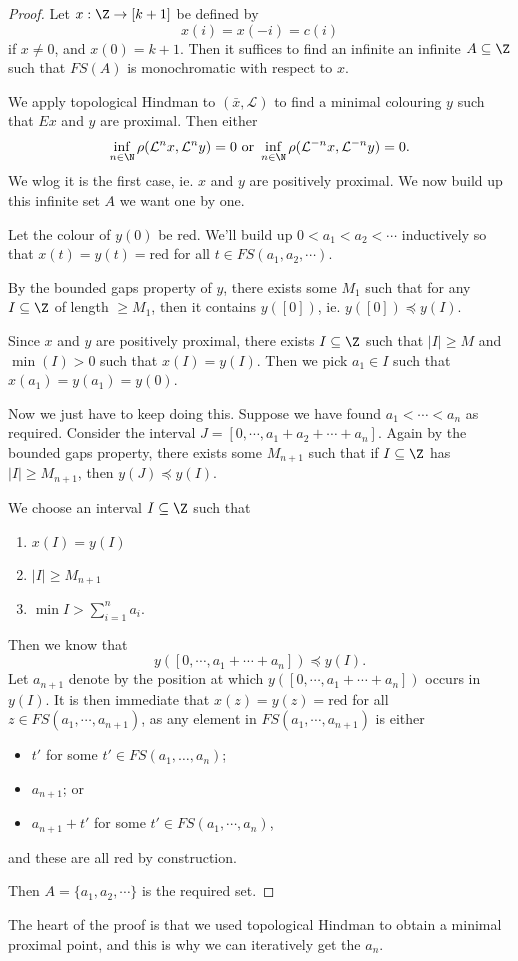 \documentclass[a4paper]{article}
\begin{document}
\begin{proof}
  Let $x: \Z \to [k + 1]$ be defined by
  \[
    x(i) = x(-i) = c(i)
  \]
  if $x\not= 0$, and $x(0) = k + 1$. Then it suffices to find an infinite an infinite $A \subseteq \Z$ such that $FS(A)$ is monochromatic with respect to $x$.

  We apply topological Hindman to $(\bar{x}, \mathcal{L})$ to find a minimal colouring $y$ such that $Ex$ and $y$ are proximal. Then either
  \[
    \inf_{n \in \N} \rho(\mathcal{L}^n x, \mathcal{L}^n y) = 0\text{ or } \inf_{n \in \N} \rho(\mathcal{L}^{-n} x, \mathcal{L}^{-n} y) = 0.
  \]
  We wlog it is the first case, ie. $x$ and $y$ are positively proximal. We now build up this infinite set $A$ we want one by one.

  Let the colour of $y(0)$ be red. We'll build up $0 < a_1 < a_2 < \cdots$ inductively so that $x(t) = y(t) = \text{red}$ for all $t \in FS(a_1, a_2, \cdots)$.

  By the bounded gaps property of $y$, there exists some $M_1$ such that for any $I \subseteq \Z$ of length $\geq M_1$, then it contains $y([0])$, ie. $y([0]) \preccurlyeq y(I)$.

  Since $x$ and $y$ are positively proximal, there exists $I \subseteq \Z$ such that $|I| \geq M$ and $\min(I) > 0$ such that $x(I) = y(I)$. Then we pick $a_1 \in I$ such that $x(a_1) = y(a_1) = y(0)$.

  Now we just have to keep doing this. Suppose we have found $a_1 < \cdots < a_n$ as required. Consider the interval $J = [0, \cdots, a_1 + a_2 + \cdots + a_n]$. Again by the bounded gaps property, there exists some $M_{n + 1}$ such that if $I \subseteq \Z$ has $|I| \geq M_{n + 1}$, then $y(J) \preccurlyeq y(I)$.

  We choose an interval $I \subseteq \Z$ such that
  \begin{enumerate}
    \item $x(I) = y(I)$
    \item $|I| \geq M_{n + 1}$
    \item $\min I > \sum_{i = 1}^n a_i$.
  \end{enumerate}
  Then we know that
  \[
    y([0, \cdots, a_1 + \cdots + a_n]) \preccurlyeq y(I).
  \]
  Let $a_{n + 1}$ denote by the position at which $y([0, \cdots, a_1 + \cdots + a_n])$ occurs in $y(I)$. It is then immediate that $x(z) = y(z) = \mathrm{red}$ for all $z \in FS(a_1, \cdots, a_{n + 1})$, as any element in $FS(a_1, \cdots, a_{n + 1})$ is either
  \begin{itemize}
    \item $t'$ for some $t' \in FS(a_1, \ldots, a_n)$;
    \item $a_{n + 1}$; or
    \item $a_{n + 1} + t'$ for some $t' \in FS(a_1, \cdots, a_n)$,
  \end{itemize}
  and these are all red by construction.

  Then $A = \{a_1, a_2, \cdots\}$ is the required set.
\end{proof}
The heart of the proof is that we used topological Hindman to obtain a minimal proximal point, and this is why we can iteratively get the $a_n$.
\end{document}
